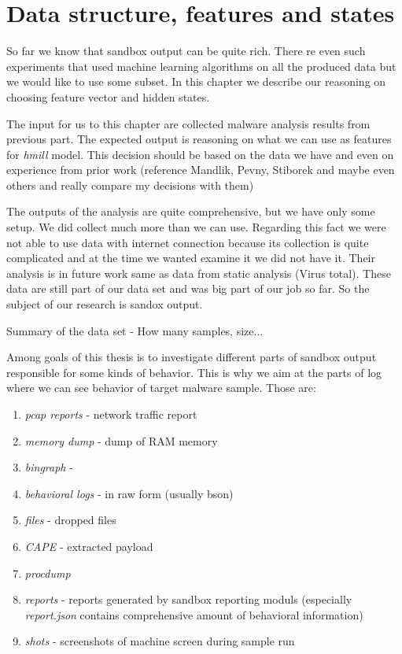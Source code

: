 \chapter{Data structure, features and states}
So far we know that sandbox output can be quite rich. There re even such experiments that used machine learning algorithms on all the produced data but we would like to use some subset. In this chapter we describe our reasoning on choosing feature vector and hidden states.

The input for us to this chapter are collected malware analysis results from previous part. The expected output is reasoning on what we can use as features for \emph{hmill} model. This decision should be based on the data we have and even on experience from prior work (reference Mandlik, Pevny, Stiborek and maybe even others and really compare my decisions with them)

The outputs of the analysis are quite comprehensive, but we have only some setup. We did collect much more than we can use. Regarding this fact we were not able to use data with internet connection because its collection is quite complicated and at the time we wanted examine it we did not have it. Their analysis is in future work same as data from static analysis (Virus total). These data are still part of our data set and was big part of our job so far. So the subject of our research is sandox output.

Summary of the data set - How many samples, size...

Among goals of this thesis is to investigate different parts of sandbox output responsible for some kinds of behavior. This is why we aim at the parts of log where we can see behavior of target malware sample. Those are:
\begin{enumerate}
  \item \emph{pcap reports} - network traffic report
  \item \emph{memory dump} - dump of RAM memory
  \item \emph{bingraph} - 
  \item \emph{behavioral logs} - in raw form (usually bson)
  \item \emph{files} - dropped files
  \item \emph{CAPE} -  extracted payload
  \item \emph{procdump}
  \item \emph{reports} - reports generated by sandbox reporting moduls (especially \emph{report.json} contains comprehensive amount of behavioral information)
  \item \emph{shots} - screenshots of machine screen during sample run
\end{enumerate}


